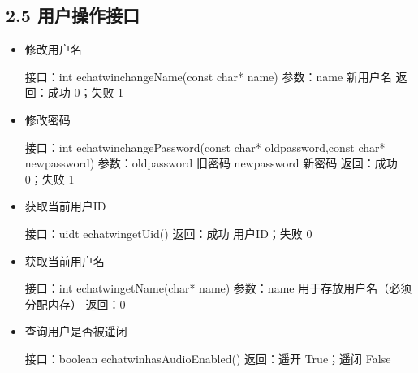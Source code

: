 \documentclass[letterpaper,10pt,english]{sphinxmanual}
\begin{document}
\subsection{2.5 用户操作接口}
\label{\detokenize{c_win:id7}}\begin{itemize}
\item {} 
修改用户名

%
\begin{sphinxVerbatim}[commandchars=\\\{\}]
接口：int echat\PYGZus{}win\PYGZus{}changeName(const char* name)
参数：name  新用户名
返回：成功 0；失败 \PYGZhy{}1
\end{sphinxVerbatim}

\item {} 
修改密码

%
\begin{sphinxVerbatim}[commandchars=\\\{\}]
接口：int echat\PYGZus{}win\PYGZus{}changePassword(const char* oldpassword,const char* newpassword)
参数：oldpassword  旧密码
  newpassword  新密码
返回：成功 0；失败 \PYGZhy{}1
\end{sphinxVerbatim}

\item {} 
获取当前用户ID

%
\begin{sphinxVerbatim}[commandchars=\\\{\}]
接口：uid\PYGZus{}t echat\PYGZus{}win\PYGZus{}getUid()
返回：成功 用户ID；失败 0
\end{sphinxVerbatim}

\item {} 
获取当前用户名

%
\begin{sphinxVerbatim}[commandchars=\\\{\}]
接口：int echat\PYGZus{}win\PYGZus{}getName(char* name)
参数：name  用于存放用户名（必须分配内存）
返回：0
\end{sphinxVerbatim}

\item {} 
查询用户是否被遥闭

%
\begin{sphinxVerbatim}[commandchars=\\\{\}]
接口：boolean echat\PYGZus{}win\PYGZus{}hasAudioEnabled()
返回：遥开 True；遥闭 False
\end{sphinxVerbatim}


\end{itemize}
\end{document}

